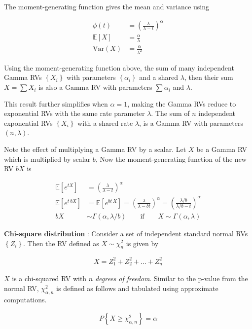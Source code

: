 The moment-generating function gives the mean and variance using

\begin{align}
	\phi(t) &= \left(\frac{\lambda}{\lambda - t}\right)^{\alpha} \\
	\mathbb{E}[X] &= \frac{\alpha}{\lambda} \\
	\mathrm{Var}(X) &= \frac{\alpha}{\lambda^2}
\end{align}

Using the moment-generating function above, the sum of many independent Gamma RVs $ \left\{X_i\right\} $ with parameters $ \left\{\alpha_i\right\} $ and a shared $ \lambda $, then their sum $ X = \sum X_i $ is also a Gamma RV with parameters $ \sum \alpha_i $ and $\lambda$.

This result further simplifies when $ \alpha = 1 $, making the Gamma RVs reduce to exponential RVs with the same rate parameter $ \lambda $. The sum of $ n $ independent exponential RVs $ \left\{X_i\right\} $ with a shared rate $ \lambda $, is a Gamma RV with parameters $ (n, \lambda) $.

Note the effect of multiplying a Gamma RV by a scalar. Let $ X $ be a Gamma RV which is multiplied by scalar $ b $, Now the moment-generating function of the new RV $ bX $ is

\begin{align}
	\mathbb{E}[e^{tX}] &= \left(\frac{\lambda}{\lambda - t}\right)^\alpha \nonumber \\
	\mathbb{E}[e^{t\ bX}] &= \mathbb{E}[e^{bt\ X}] = \left(\frac{\lambda}{\lambda - bt}\right)^\alpha = \left(\frac{\lambda / b}{\lambda / b - t}\right)^\alpha \nonumber \\
	bX &\sim \Gamma(\alpha, \lambda / b)  \qquad \text{if} \qquad X \sim \Gamma(\alpha, \lambda)
\end{align}

\textbf{Chi-square distribution} : Consider a set of independent standard normal RVs $ \left\{Z_i\right\} $. Then the RV defined as $ X \sim \chi_n^2 $ is given by

\begin{align}
	X = Z_1^2 + Z_2^2 + \dots + Z_n^2
\end{align}

$ X $ is a chi-squared RV with $ n $ \textit{degrees of freedom}. Similar to the p-value from the normal RV, $ \chi_{\alpha, n}^2 $ is defined as follows and tabulated using approximate computations.

\begin{align}
	P \left\{X \geq \chi_{\alpha, n}^2 \right\} = \alpha
\end{align}


